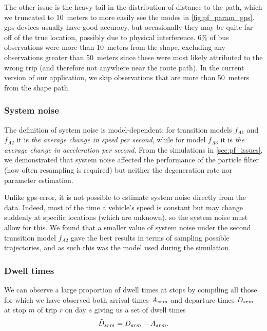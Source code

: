 The other issue is the heavy tail in the distribution of distance to the path, which we truncated to 10~meters to more easily see the modes in \cref{fig:pf_param_gps}. \gls{gps} devices usually have good accuracy, but occasionally they may be quite far off of the true location, possibly due to physical interference. 6\% of bus observations were more than 10~meters from the shape, excluding any observations greater than 50~meters since these were most likely attributed to the wrong trip (and therefore not anywhere near the route path). In the current version of our application, we skip observations that are more than 50~meters from the shape path.





\subsubsection{System noise}
\label{sec:pf_params_noise}

The definition of system noise is model-dependent; for transition models $f_{A1}$ and $f_{A2}$ it is \emph{the average change in speed per second}, while for model $f_{A3}$ it is \emph{the average change in acceleration per second}. From the simulations in \cref{sec:pf_issues}, we demonstrated that system noise affected the performance of the particle filter (how often resampling is required) but neither the degeneration rate nor parameter estimation.

Unlike \gls{gps} error, it is not possible to estimate system noise directly from the data. Indeed, most of the time a vehicle's speed is constant but may change suddenly at specific locations (which are unknown), so the system noise must allow for this. We found that a smaller value of system noise under the second transition model $f_{A2}$ gave the best results in terms of sampling possible trajectories, and as such this was the model used during the simulation.



\subsubsection{Dwell times}
\label{sec:pf_params_dwell}

We can observe a large proportion of dwell times at stops by compiling all those for which we have observed both arrival times $A_{srm}$ and departure times $D_{srm}$ at stop $m$ of trip $r$ on day $s$ giving us a set of dwell times
\begin{equation}
\label{eq:dwell_time_obs}
\tilde{D}_{srm} = D_{srm} - A_{srm}.
\end{equation}


